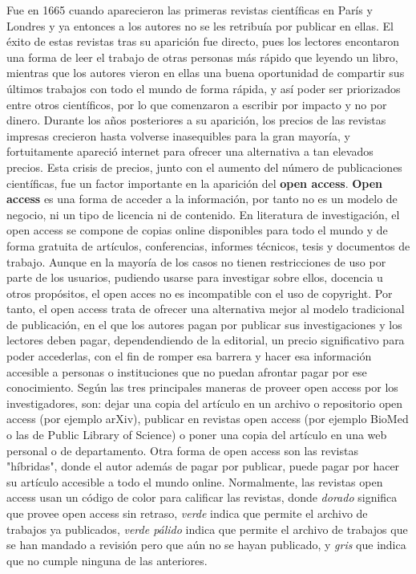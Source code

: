 Fue en 1665 cuando aparecieron las primeras revistas científicas en París y Londres y ya entonces a los autores no se les retribuía por publicar en ellas. El éxito de estas revistas tras su aparición fue directo, pues los lectores encontaron una forma de leer el trabajo de otras personas más rápido que leyendo un libro,  
mientras que los autores vieron en ellas una buena oportunidad de compartir sus últimos trabajos con todo el mundo de forma rápida, y así poder ser priorizados entre otros científicos, por lo que comenzaron a escribir por impacto y no por dinero. Durante los años posteriores a su aparición, los precios de las revistas impresas crecieron hasta volverse inasequibles para la gran mayoría, y fortuitamente apareció internet para ofrecer una alternativa a tan elevados precios. Esta crisis de precios, junto con el aumento del número de publicaciones científicas, fue un factor importante en la aparición del \textbf{open access}.
\newline
\newline
\textbf{Open access} es una forma de acceder a la información, por tanto no es un modelo de negocio, ni un tipo de licencia ni de contenido. En literatura de investigación, el open access se compone de copias online disponibles para todo el mundo y de forma gratuita de artículos, conferencias, informes técnicos, tesis y documentos de trabajo. Aunque en la mayoría de los casos no tienen restricciones de uso por parte de los usuarios, pudiendo usarse para investigar sobre ellos, docencia u otros propósitos, el open acces no es incompatible con el uso de copyright.\newline 
Por tanto, el open access trata de ofrecer una alternativa mejor al modelo tradicional de publicación, en el que los autores pagan por publicar sus investigaciones y los lectores deben pagar, dependendiendo de la editorial, un precio significativo para poder accederlas, con el fin de romper esa barrera y hacer esa información accesible a personas o instituciones que no puedan afrontar pagar por ese conocimiento.
\newline
Según \cite{suber2007open} las tres principales maneras de proveer open access por los investigadores, son: dejar una copia del artículo en un archivo o repositorio open access (por ejemplo arXiv), publicar en revistas open access (por ejemplo BioMed o las de Public Library of Science) o poner una copia del artículo en una web personal o de departamento. Otra forma de open access son las revistas "híbridas", donde el autor además de pagar por publicar, puede pagar por hacer su artículo accesible a todo el mundo online. Normalmente, las revistas open access usan un código de color para calificar las revistas, donde \textit{dorado} significa que provee open access sin retraso, \textit{verde} indica que permite el archivo de trabajos ya publicados, \textit{verde pálido} indica que permite el archivo de trabajos que se han mandado a revisión pero que aún no se hayan publicado, y \textit{gris} que indica que no cumple ninguna de las anteriores.

